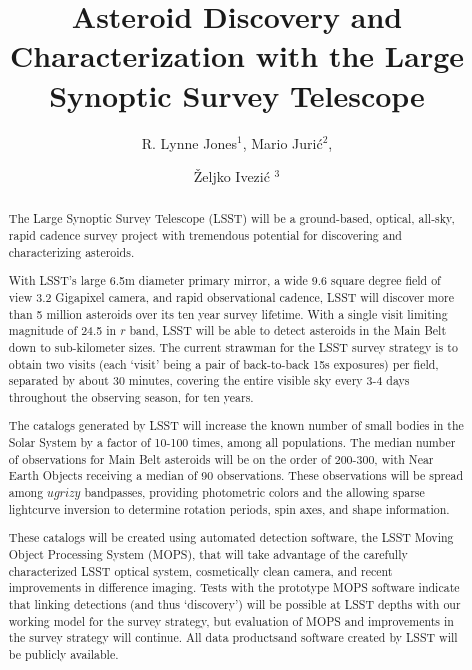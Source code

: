 \documentclass{iau}
\title[Asteroids in LSST] %
{Asteroid Discovery and Characterization with the Large Synoptic Survey Telescope}
\author[R. Lynne Jones, Mario Juric]   %
{R. Lynne Jones$^1$, Mario Juri\'{c}$^2$, 
 \and \v{Z}eljko Ivezi\'{c} $^3$}
\affiliation{$^1$University of Washington\\ email: {\tt ljones@astro.washington.edu} \\[\affilskip]
$^2$University of Washington \\email: {\tt mjuric@astro.astro.washington.edu}
$^3$University of Washington \\email: {\tt ivezic@astro.astro.washington.edu}}
\begin{document}
\maketitle

\begin{abstract}
The Large Synoptic Survey Telescope (LSST) will be a ground-based,
optical, all-sky, rapid cadence survey project with tremendous
potential for discovering and characterizing asteroids.

With LSST's large 6.5m diameter primary mirror, a wide 9.6 square
degree field of view 3.2 Gigapixel camera, and rapid observational
cadence, LSST will discover more than 5 million asteroids over its ten
year survey lifetime. With a single visit limiting magnitude of 24.5
in $r$ band, LSST will be able to detect asteroids in the Main Belt
down to sub-kilometer sizes.  The current strawman for the LSST survey
strategy is to obtain two visits (each `visit' being a pair of
back-to-back 15s exposures) per field, separated by about 30 minutes,
covering the entire visible sky every 3-4 days throughout the
observing season, for ten years.

The catalogs generated by LSST will increase the known number of small
bodies in the Solar System by a factor of 10-100 times, among all
populations. The median number of observations for Main Belt asteroids
will be on the order of 200-300, with Near Earth Objects receiving a
median of 90 observations. These observations will be spread among
$ugrizy$ bandpasses, providing photometric colors and the allowing
sparse lightcurve inversion to determine rotation periods, spin axes, and shape information.

These catalogs will be created using automated detection software, the
LSST Moving Object Processing System (MOPS), that will take advantage
of the carefully characterized LSST optical system, cosmetically
clean camera, and recent improvements in difference imaging. Tests
with the prototype MOPS software indicate that linking detections (and thus
`discovery') will be possible at LSST depths with our working
model for the survey strategy, but evaluation of MOPS and improvements
in the survey strategy will continue. All data productsand software created by
LSST will be publicly available.
\end{abstract}

\firstsection %
\end{document}
